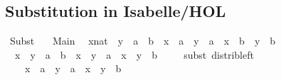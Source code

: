 %
\begin{isabellebody}%
%
%
\begin{isamarkuptext}%
\section*{Substitution in Isabelle/HOL}%
\end{isamarkuptext}\isamarkuptrue%
%
\isadelimtheory
%
\endisadelimtheory
%
\isatagtheory
{}\isamarkupfalse%
\ Subst\isanewline
\ \ \ Main\isanewline
{}%
\endisatagtheory
{\isafoldtheory}%
%
\isadelimtheory
%
\endisadelimtheory
\isanewline
\isanewline
{}\isamarkupfalse%
\isanewline
\ \ {\isachardoublequoteopen}{\isacharparenleft}{\kern0pt}{\isacharparenleft}{\kern0pt}x{\isacharcolon}{\kern0pt}{\isacharcolon}{\kern0pt}nat{\isacharparenright}{\kern0pt}\ {\isacharplus}{\kern0pt}\ y{\isacharparenright}{\kern0pt}\ {\isacharasterisk}{\kern0pt}\ {\isacharparenleft}{\kern0pt}a\ {\isacharplus}{\kern0pt}\ b{\isacharparenright}{\kern0pt}\ {\isacharequal}{\kern0pt}\ x\ {\isacharasterisk}{\kern0pt}\ a\ {\isacharplus}{\kern0pt}\ y\ {\isacharasterisk}{\kern0pt}\ a\ {\isacharplus}{\kern0pt}\ x\ {\isacharasterisk}{\kern0pt}\ b\ {\isacharplus}{\kern0pt}\ y\ {\isacharasterisk}{\kern0pt}\ b{\isachardoublequoteclose}\isanewline
%
\isadelimproof
%
\endisadelimproof
%
\isatagproof
{}\isamarkupfalse%
{\isacharminus}{\kern0pt}\isanewline
\ \ \isamarkupfalse%
\ {}{\isacharcolon}{\kern0pt}\ {\isachardoublequoteopen}{\isacharparenleft}{\kern0pt}x\ {\isacharplus}{\kern0pt}\ y{\isacharparenright}{\kern0pt}\ {\isacharasterisk}{\kern0pt}\ {\isacharparenleft}{\kern0pt}a\ {\isacharplus}{\kern0pt}\ b{\isacharparenright}{\kern0pt}\ {\isacharequal}{\kern0pt}\ {\isacharparenleft}{\kern0pt}x\ {\isacharplus}{\kern0pt}\ y{\isacharparenright}{\kern0pt}\ {\isacharasterisk}{\kern0pt}\ a\ {\isacharplus}{\kern0pt}\ {\isacharparenleft}{\kern0pt}x\ {\isacharplus}{\kern0pt}\ y{\isacharparenright}{\kern0pt}\ {\isacharasterisk}{\kern0pt}\ b{\isachardoublequoteclose}\isanewline
\ \ \ \ \isamarkupfalse%
{\isacharparenleft}{\kern0pt}subst\ distrib{\isacharunderscore}{\kern0pt}left{\isacharparenright}{\kern0pt}\isanewline
\ \ \ \ \isacommand{{\isachardot}{\kern0pt}{\isachardot}{\kern0pt}}\isamarkupfalse%
\isanewline
\ \ \isamarkupfalse%
\ \isamarkupfalse%
\ {}{\isacharcolon}{\kern0pt}\ {\isachardoublequoteopen}{\isachardot}{\kern0pt}{\isachardot}{\kern0pt}{\isachardot}{\kern0pt}\ {\isacharequal}{\kern0pt}\ x\ {\isacharasterisk}{\kern0pt}\ a\ {\isacharplus}{\kern0pt}\ y\ {\isacharasterisk}{\kern0pt}\ a\ {\isacharplus}{\kern0pt}\ {\isacharparenleft}{\kern0pt}x\ {\isacharplus}{\kern0pt}\ y{\isacharparenright}{\kern0pt}\ {\isacharasterisk}{\kern0pt}\ b{\isachardoublequoteclose}\isanewline

\end{isabellebody}
